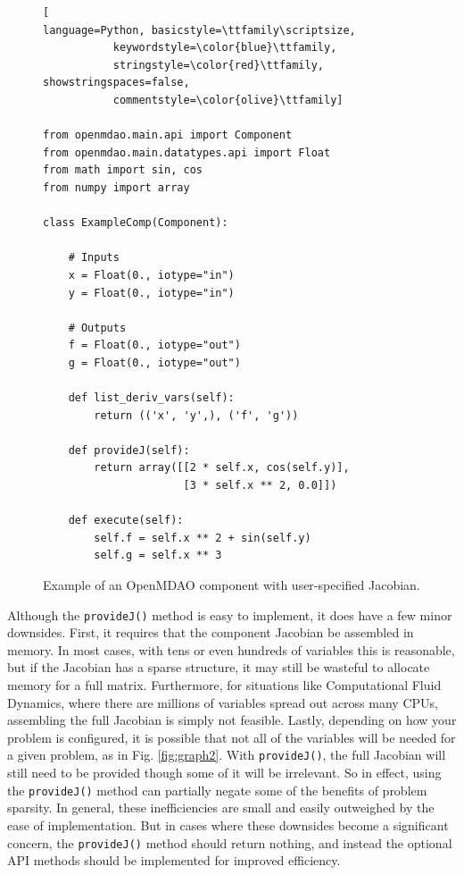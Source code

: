 \documentclass[]{aiaa-tc} %
\begin{document}
\begin{figure}
\begin{minipage}{\textwidth}
\begin{lstlisting}[
language=Python, basicstyle=\ttfamily\scriptsize,
           keywordstyle=\color{blue}\ttfamily,
           stringstyle=\color{red}\ttfamily, showstringspaces=false,
           commentstyle=\color{olive}\ttfamily]

from openmdao.main.api import Component
from openmdao.main.datatypes.api import Float
from math import sin, cos
from numpy import array

class ExampleComp(Component):

    # Inputs
    x = Float(0., iotype="in")
    y = Float(0., iotype="in")

    # Outputs
    f = Float(0., iotype="out")
    g = Float(0., iotype="out")

    def list_deriv_vars(self):
        return (('x', 'y',), ('f', 'g'))

    def provideJ(self):
        return array([[2 * self.x, cos(self.y)],
                      [3 * self.x ** 2, 0.0]])

    def execute(self):
        self.f = self.x ** 2 + sin(self.y)
        self.g = self.x ** 3

\end{lstlisting}
\caption{Example of an OpenMDAO
component with user-specified Jacobian.
\label{fig:code-block-1}}
\end{minipage}

\end{figure}

        Although the \texttt{provideJ()} method is easy to implement, it does have a few minor downsides. First,
        it requires that the component Jacobian be assembled in memory. In most cases, with tens or even hundreds of variables
        this is reasonable, but if the Jacobian has a sparse structure, it may still be wasteful to allocate memory for a
        full matrix. Furthermore, for situations like Computational Fluid Dynamics, where there are millions of variables spread out
        across many CPUs, assembling the full Jacobian is simply not feasible. Lastly, depending on how
        your problem is configured, it is possible that not all of the variables will be needed for a given problem, as in Fig. \ref{fig:graph2}.
        With \texttt{provideJ()}, the full Jacobian will still need to be provided though some of it will be irrelevant.
        So in effect, using the \texttt{provideJ()} method can partially negate some of the benefits of problem sparsity.
        In general, these inefficiencies are small and easily outweighed by the ease of implementation. But in cases where
        these downsides become a significant concern, the \texttt{provideJ()} method should return nothing, and instead the
        optional API methods should be implemented for improved efficiency.
\end{document}
